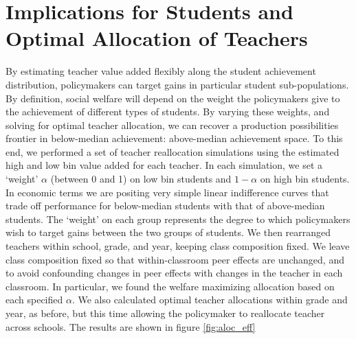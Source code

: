 \documentclass[12pt]{article}
\theoremstyle{definition}
\theoremstyle{definition}
\theoremstyle{definition}
\theoremstyle{definition}
\begin{document}

\section{Implications for Students and Optimal Allocation of Teachers} \label{swell}

By estimating teacher value added flexibly along the student achievement distribution, policymakers can target gains in particular student sub-populations. By definition, social welfare will depend on the weight the policymakers give to the achievement of different types of students. By varying these weights, and solving for optimal teacher allocation, we can recover a production possibilities frontier in below-median achievement: above-median achievement space. To this end, we performed a set of teacher reallocation simulations using the estimated high and low bin value added for each teacher. In each simulation, we set a ‘weight’ $\alpha$ (between 0 and 1) on low bin students and $1 - \alpha$ on high bin students. In economic terms we are positing very simple linear indifference curves that trade off performance for below-median students with that of above-median students. The ‘weight’ on each group represents the degree to which policymakers wish to target gains between the two groups of students. We then rearranged teachers within school, grade, and year, keeping class composition fixed. We leave class composition fixed so that within-classroom peer effects are unchanged, and to avoid confounding changes in peer effects with changes in the teacher in each classroom. In particular, we found the welfare maximizing allocation based on each specified $\alpha$. We also calculated optimal teacher allocations within grade and year, as before, but this time allowing the policymaker to reallocate teacher across schools. The results are shown in figure \ref{fig:aloc_eff}
\end{document}
